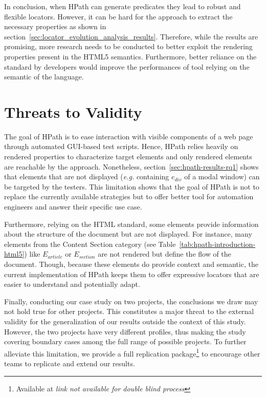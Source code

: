 In conclusion, when HPath can generate predicates they lead to robust and flexible locators. However, it can be hard for the approach to extract the necessary properties as shown in section~\ref{sec:locator_evolution_analysis_results}. Therefore, while the results are promising, more research needs to be conducted to better exploit the rendering properties present in the HTML5 semantics. Furthermore, better reliance on the standard by developers would improve the performances of tool relying on the semantic of the language.

\section{Threats to Validity}

The goal of HPath is to ease interaction with visible components of a web page through automated GUI-based test scripts. Hence, HPath relies heavily on rendered properties to characterize target elements and only rendered elements are reachable by the approach. Nonetheless, section~\ref{sec:hpath-results-rq1} shows that elements that are not displayed (\emph{e.g.} containing $e_{div}$ of a modal window) can be targeted by the testers. This limitation shows that the goal of HPath is not to replace the currently available strategies but to offer better tool for automation engineers and answer their specific use case.

Furthermore, relying on the HTML standard, some elements provide information about the structure of the document but are not displayed. For instance, many elements from the Content Section category (see Table~\ref{tab:hpath-introduction-html5}) like $E_{article}$ or $E_{section}$ are not rendered but define the flow of the document. Though, because these elements do provide context and semantic, the current implementation of HPath keeps them to offer expressive locators that are easier to understand and potentially adapt.

Finally, conducting our case study on two projects, the conclusions we draw may not hold true for other projects. This constitutes a major threat to the external validity for the generalization of our results outside the context of this study. However, the two projects have very different profiles, thus making the study covering boundary cases among the full range of possible projects. To further alleviate this limitation, we provide a full replication package\footnote{Available at \emph{link not available for double blind process}} to encourage other teams to replicate and extend our results.


